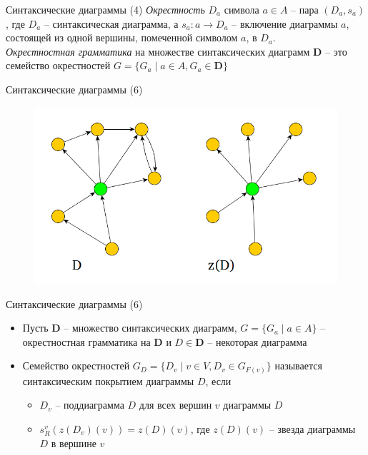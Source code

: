 \documentclass{beamer}
\begin{document}
\begin{frame}{Синтаксические диаграммы (4)}
\textit{Окрестность} $D_a$ символа $a \in A$ -- пара  $(D_a, s_a)$, где $D_a$ -- синтаксическая диаграмма, а $s_a : a \to D_a$ -- включение диаграммы $a$, состоящей из одной вершины, помеченной символом $a$, в $D_a$.\\
\bigskip
\textit{Окрестностная грамматика} на множестве синтаксических диаграмм $\mathbf{D}$ -- это семейство окрестностей $G = \{ G_a \; \vert \; a \in A, G_a \in \mathbf{D} \}$
\end{frame}

\begin{frame}{Синтаксические диаграммы (6)}
\begin{figure}[H]
\includegraphics[scale=0.46]{star.png} 
\end{figure}
\end{frame}

\begin{frame}{Синтаксические диаграммы (6)}
\begin{itemize}
	\item Пусть $\mathbf{D}$ -- множество синтаксических диаграмм, $G = \{ G_a \; \vert \; a \in A \}$ -- окрестностная грамматика на $\mathbf{D}$ и $D \in \mathbf{D}$ -- некоторая диаграмма
	\item Семейство окрестностей $G_D = \{ D_v \; \vert \; v \in V, D_v \in G_{F(v)} \}$ называется синтаксическим покрытием диаграммы $D$, если
		\begin{itemize}
			\item $D_v$ -- поддиаграмма $D$ для всех вершин $v$ диаграммы $D$
			\item $s^v_R(z(D_v)(v)) = z(D)(v)$, где $z(D)(v)$ -- звезда диаграммы $D$ в вершине $v$
		\end{itemize}
\end{itemize}
\end{frame}
\end{document}
